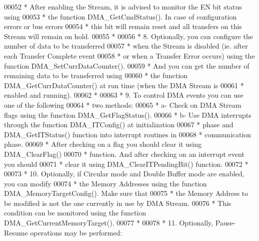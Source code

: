 \begin{DoxyCode}
00052 \textcolor{comment}{  *             After enabling the Stream, it is advised to monitor the EN bit status using}
00053 \textcolor{comment}{  *             the function DMA\_GetCmdStatus(). In case of configuration errors or bus errors}
00054 \textcolor{comment}{  *             this bit will remain reset and all transfers on this Stream will remain on hold.      }
00055 \textcolor{comment}{  *}
00056 \textcolor{comment}{  *          8. Optionally, you can configure the number of data to be transferred}
00057 \textcolor{comment}{  *             when the Stream is disabled (ie. after each Transfer Complete event}
00058 \textcolor{comment}{  *             or when a Transfer Error occurs) using the function DMA\_SetCurrDataCounter().}
00059 \textcolor{comment}{  *             And you can get the number of remaining data to be transferred using }
00060 \textcolor{comment}{  *             the function DMA\_GetCurrDataCounter() at run time (when the DMA Stream is}
00061 \textcolor{comment}{  *             enabled and running).  }
00062 \textcolor{comment}{  *                   }
00063 \textcolor{comment}{  *          9. To control DMA events you can use one of the following }
00064 \textcolor{comment}{  *              two methods:}
00065 \textcolor{comment}{  *               a- Check on DMA Stream flags using the function DMA\_GetFlagStatus().  }
00066 \textcolor{comment}{  *               b- Use DMA interrupts through the function DMA\_ITConfig() at initialization}
00067 \textcolor{comment}{  *                  phase and DMA\_GetITStatus() function into interrupt routines in}
00068 \textcolor{comment}{  *                  communication phase.  }
00069 \textcolor{comment}{  *              After checking on a flag you should clear it using DMA\_ClearFlag()}
00070 \textcolor{comment}{  *              function. And after checking on an interrupt event you should }
00071 \textcolor{comment}{  *              clear it using DMA\_ClearITPendingBit() function.    }
00072 \textcolor{comment}{  *              }
00073 \textcolor{comment}{  *          10. Optionally, if Circular mode and Double Buffer mode are enabled, you can modify}
00074 \textcolor{comment}{  *              the Memory Addresses using the function DMA\_MemoryTargetConfig(). Make sure that}
00075 \textcolor{comment}{  *              the Memory Address to be modified is not the one currently in use by DMA Stream.}
00076 \textcolor{comment}{  *              This condition can be monitored using the function DMA\_GetCurrentMemoryTarget().}
00077 \textcolor{comment}{  *              }
00078 \textcolor{comment}{  *          11. Optionally, Pause-Resume operations may be performed:}

\end{DoxyCode}
